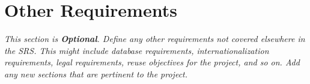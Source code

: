 
\section{Other Requirements}
    \emph{This section is \textbf{Optional}. Define any other requirements not covered elsewhere in the SRS. This might include database requirements, internationalization requirements, legal requirements, reuse objectives for the project, and so on. Add any new sections that are pertinent to the project.}

